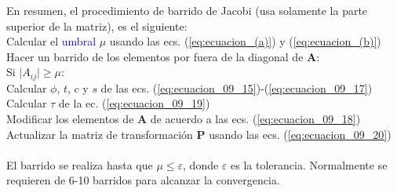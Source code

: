 \begin{frame}
En resumen, el procedimiento de barrido de Jacobi (usa solamente la parte superior de la matriz), es el siguiente:
\\
\fontsize{11}{11}\selectfont
Calcular el \textcolor{blue}{umbral} $\mu$ usando las ecs. (\ref{eq:ecuacion_(a)}) y (\ref{eq:ecuacion_(b)})
\\
Hacer un barrido de los elementos por fuera de la diagonal de $\mathbf{A}$:
\\
\hspace{0.5cm} Si $\vert A_{ij} \vert \geq \mu$:
\\
\hspace{1cm} Calcular $\phi$, $t$, $c$ y $s$ de las ecs. (\ref{eq:ecuacion_09_15})-(\ref{eq:ecuacion_09_17})
\\
\hspace{1cm} Calcular $\tau$ de la ec. (\ref{eq:ecuacion_09_19})
\\
\hspace{1cm} Modificar los elementos de $\mathbf{A}$ de acuerdo a las ecs. (\ref{eq:ecuacion_09_18})
\\
\hspace{1cm} Actualizar la matriz de transformación $\mathbf{P}$ usando las ecs. (\ref{eq:ecuacion_09_20})
\\
\\
El barrido se realiza hasta que $\mu \leq \varepsilon$, donde $\varepsilon$ es la tolerancia. Normalmente se requieren de 6-10 barridos para alcanzar la convergencia.
\end{frame}

